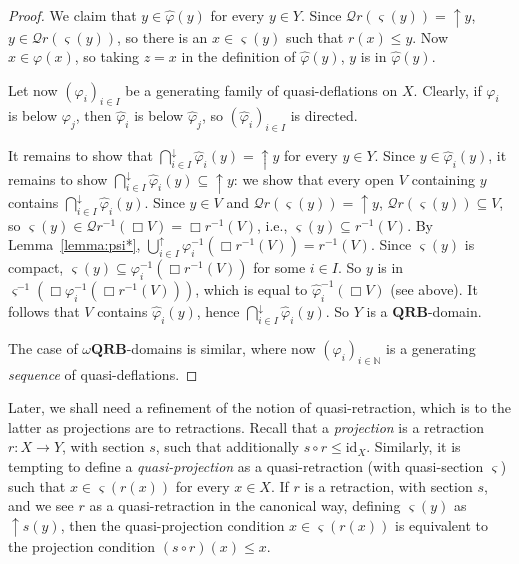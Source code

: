 \documentclass{LMCS}
\newcommand\nat{\mathbb{N}}
\newcommand\Smyth{\mathcal Q}
\newcommand\upc{\mathop{\uparrow}\nolimits}
\newcommand\QRB{\mathbf{QRB}}
\newcommand{\identity}[1]{\mathrm{id}_{#1}}
\newcommand\qs{\varsigma}
\begin{document}
\begin{proof}
  We claim that $y \in \widehat\varphi (y)$ for every $y \in Y$.
  Since $\Smyth r (\qs (y)) = \upc y$, $y \in \Smyth r (\qs (y))$, so
  there is an $x \in \qs (y)$ such that $r (x) \leq y$.  Now $x \in
  \varphi (x)$, so taking $z = x$ in the definition of
  $\widehat\varphi (y)$, $y$ is in $\widehat\varphi (y)$.

  Let now ${(\varphi_i)}_{i \in I}$ be a generating family of
  quasi-deflations on $X$.  Clearly, if $\varphi_i$ is below
  $\varphi_j$, then $\widehat\varphi_i$ is below $\widehat\varphi_j$,
  so ${(\widehat\varphi_i)}_{i \in I}$ is directed.

  It remains to show that $\bigcap_{i \in I}^\downarrow
  \widehat\varphi_i (y) = \upc y$ for every $y \in Y$.  Since $y \in
  \widehat\varphi_i (y)$, it remains to show $\bigcap_{i \in
    I}^\downarrow \widehat\varphi_i (y) \subseteq \upc y$: we show
  that every open $V$ containing $y$ contains $\bigcap_{i \in
    I}^\downarrow \widehat\varphi_i (y)$.  Since $y \in V$ and $\Smyth
  r (\qs (y)) = \upc y$, $\Smyth r (\qs (y)) \subseteq V$, so $\qs (y)
  \in \Smyth r^{-1} (\Box V) = \Box r^{-1} (V)$, i.e., $\qs (y)
  \subseteq r^{-1} (V)$. By Lemma~\ref{lemma:psi*}, $\bigcup_{i \in I}^\uparrow
  \varphi_i^{-1} (\Box r^{-1} (V)) = r^{-1} (V)$.  Since $\qs (y)$ is
  compact, $\qs (y) \subseteq \varphi_i^{-1} (\Box r^{-1} (V))$ for
  some $i \in I$.  So $y$ is in $\qs^{-1} (\Box \varphi_i^{-1} (\Box
  r^{-1} (V)))$, which is equal to $\widehat\varphi_i^{-1} (\Box V)$
  (see above).  It follows that $V$ contains $\widehat\varphi_i (y)$,
  hence $\bigcap_{i \in I}^\downarrow \widehat\varphi_i (y)$.  So $Y$
  is a $\QRB$-domain.

  The case of $\omega\QRB$-domains is similar, where now
  ${(\varphi_i)}_{i \in \nat}$ is a generating {\em sequence\/} of
  quasi-deflations.
\end{proof}

Later, we shall need a refinement of the notion of quasi-retraction,
which is to the latter as projections are to retractions.  Recall that
a {\em projection\/} is a retraction $r : X \to Y$, with section $s$,
such that additionally $s \circ r \leq \identity X$.  Similarly, it is
tempting to define a \emph{quasi-projection} as a quasi-retraction
(with quasi-section $\qs$) such that $x \in \qs (r (x))$ for every $x
\in X$.  If $r$ is a retraction, with section $s$, and we see $r$ as a
quasi-retraction in the canonical way, defining $\qs (y)$ as $\upc s
(y)$, then the quasi-projection condition $x \in \qs (r (x))$ is
equivalent to the projection condition $(s \circ r) (x) \leq x$.
\end{document}
